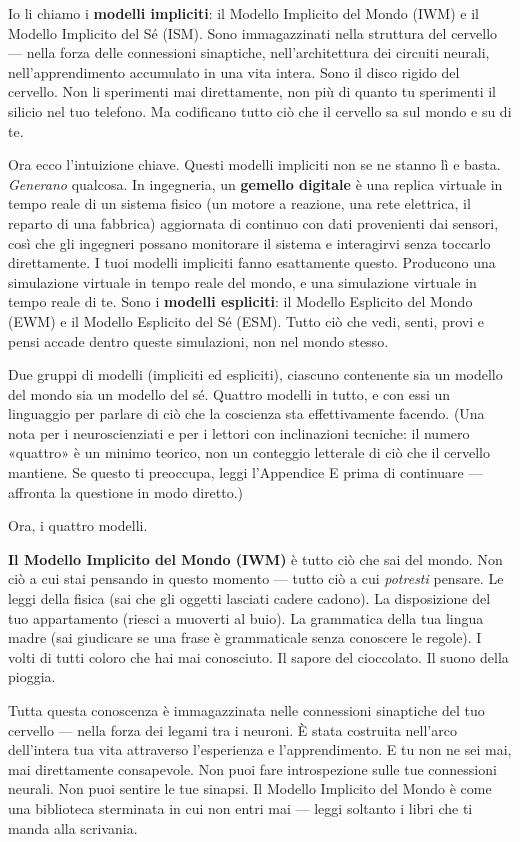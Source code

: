 \documentclass[11pt, twoside, openright]{book}
\begin{document}
Io li chiamo i \textbf{modelli impliciti}: il Modello Implicito del Mondo (IWM) e il Modello Implicito del Sé (ISM). Sono immagazzinati nella struttura del cervello --- nella forza delle connessioni sinaptiche, nell'architettura dei circuiti neurali, nell'apprendimento accumulato in una vita intera. Sono il disco rigido del cervello. Non li sperimenti mai direttamente, non più di quanto tu sperimenti il silicio nel tuo telefono. Ma codificano tutto ciò che il cervello sa sul mondo e su di te.

Ora ecco l'intuizione chiave. Questi modelli impliciti non se ne stanno lì e basta. \textit{Generano} qualcosa. In ingegneria, un \textbf{gemello digitale} è una replica virtuale in tempo reale di un sistema fisico (un motore a reazione, una rete elettrica, il reparto di una fabbrica) aggiornata di continuo con dati provenienti dai sensori, così che gli ingegneri possano monitorare il sistema e interagirvi senza toccarlo direttamente. I tuoi modelli impliciti fanno esattamente questo. Producono una simulazione virtuale in tempo reale del mondo, e una simulazione virtuale in tempo reale di te. Sono i \textbf{modelli espliciti}: il Modello Esplicito del Mondo (EWM) e il Modello Esplicito del Sé (ESM). Tutto ciò che vedi, senti, provi e pensi accade dentro queste simulazioni, non nel mondo stesso.

Due gruppi di modelli (impliciti ed espliciti), ciascuno contenente sia un modello del mondo sia un modello del sé. Quattro modelli in tutto, e con essi un linguaggio per parlare di ciò che la coscienza sta effettivamente facendo. (Una nota per i neuroscienziati e per i lettori con inclinazioni tecniche: il numero «quattro» è un minimo teorico, non un conteggio letterale di ciò che il cervello mantiene. Se questo ti preoccupa, leggi l'Appendice E prima di continuare --- affronta la questione in modo diretto.)

Ora, i quattro modelli.

\textbf{Il Modello Implicito del Mondo (IWM)} è tutto ciò che sai del mondo. Non ciò a cui stai pensando in questo momento --- tutto ciò a cui \textit{potresti} pensare. Le leggi della fisica (sai che gli oggetti lasciati cadere cadono). La disposizione del tuo appartamento (riesci a muoverti al buio). La grammatica della tua lingua madre (sai giudicare se una frase è grammaticale senza conoscere le regole). I volti di tutti coloro che hai mai conosciuto. Il sapore del cioccolato. Il suono della pioggia.

Tutta questa conoscenza è immagazzinata nelle connessioni sinaptiche del tuo cervello --- nella forza dei legami tra i neuroni. È stata costruita nell'arco dell'intera tua vita attraverso l'esperienza e l'apprendimento. E tu non ne sei mai, mai direttamente consapevole. Non puoi fare introspezione sulle tue connessioni neurali. Non puoi sentire le tue sinapsi. Il Modello Implicito del Mondo è come una biblioteca sterminata in cui non entri mai --- leggi soltanto i libri che ti manda alla scrivania.
\end{document}
